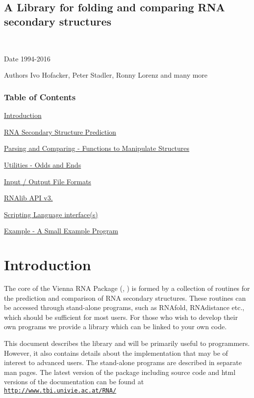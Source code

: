 ~\newline
 

\subsection*{A Library for folding and comparing R\+N\+A secondary structures}



~\newline
 \begin{DoxyDate}{Date}
1994-\/2016 
\end{DoxyDate}
\begin{DoxyAuthor}{Authors}
Ivo Hofacker, Peter Stadler, Ronny Lorenz and many more
\end{DoxyAuthor}
\subsubsection*{Table of Contents}





\begin{DoxyItemize}
\item \hyperlink{index_mp_intro}{Introduction} \item \hyperlink{group__folding__routines}{R\+N\+A Secondary Structure Prediction} \item \hyperlink{mp_parse}{Parsing and Comparing -\/ Functions to Manipulate Structures} \item \hyperlink{mp_utils}{Utilities -\/ Odds and Ends} \item \hyperlink{file_formats}{Input / Output File Formats} \item \hyperlink{newAPI}{R\+N\+Alib A\+P\+I v3.} \item \hyperlink{swig_interface}{Scripting Language interface(s)} \item \hyperlink{mp_example}{Example -\/ A Small Example Program}\end{DoxyItemize}


\hypertarget{index_mp_intro}{}\section{Introduction}\label{index_mp_intro}
The core of the Vienna R\+N\+A Package (\cite{lorenz:2011}, \cite{hofacker:1994}) is formed by a collection of routines for the prediction and comparison of R\+N\+A secondary structures. These routines can be accessed through stand-\/alone programs, such as R\+N\+Afold, R\+N\+Adistance etc., which should be sufficient for most users. For those who wish to develop their own programs we provide a library which can be linked to your own code.

This document describes the library and will be primarily useful to programmers. However, it also contains details about the implementation that may be of interest to advanced users. The stand-\/alone programs are described in separate man pages. The latest version of the package including source code and html versions of the documentation can be found at ~\newline
~\newline
\href{http://www.tbi.univie.ac.at/RNA/}{\tt http\+://www.\+tbi.\+univie.\+ac.\+at/\+R\+N\+A/} 
